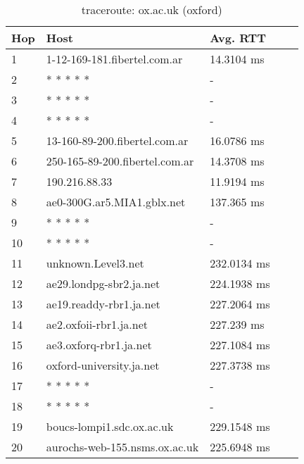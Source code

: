 \begin{table}[H]
\centering
\begin{tabular}{@{}lllll@{}}
\toprule
Hop & Host & Avg. RTT \\ \midrule
1 & 1-12-169-181.fibertel.com.ar & 14.3104 ms\\
2 &  * * * * * & - \\
3 &  * * * * * & - \\
4 &  * * * * * & - \\
5 & 13-160-89-200.fibertel.com.ar & 16.0786 ms\\
6 & 250-165-89-200.fibertel.com.ar & 14.3708 ms\\
7 & 190.216.88.33 & 11.9194 ms\\
8 & ae0-300G.ar5.MIA1.gblx.net & 137.365 ms\\
9 &  * * * * * & - \\
10 &  * * * * * & - \\
11 & unknown.Level3.net & 232.0134 ms\\
12 & ae29.londpg-sbr2.ja.net & 224.1938 ms\\
13 & ae19.readdy-rbr1.ja.net & 227.2064 ms\\
14 & ae2.oxfoii-rbr1.ja.net & 227.239 ms\\
15 & ae3.oxforq-rbr1.ja.net & 227.1084 ms\\
16 & oxford-university.ja.net & 227.3738 ms\\
17 &  * * * * * & - \\
18 &  * * * * * & - \\
19 & boucs-lompi1.sdc.ox.ac.uk & 229.1548 ms\\
20 & aurochs-web-155.nsms.ox.ac.uk & 225.6948 ms\\ \bottomrule
\end{tabular}
\caption{traceroute: ox.ac.uk (oxford)}
\label{oxford}
\end{table}

